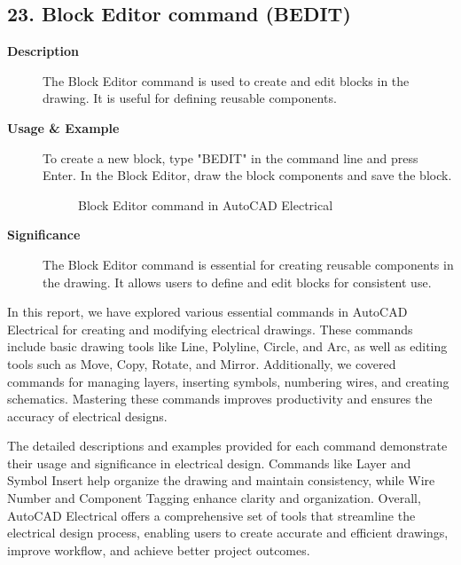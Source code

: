 \documentclass[12pt]{article}
\begin{document}
\subsection*{23. Block Editor command (BEDIT)}
\begin{description}
    \item [\textbf{Description}] The Block Editor command is used to create and edit blocks in the drawing. It is useful for defining reusable components.
    \item [\textbf{Usage \& Example}]To create a new block, type "BEDIT" in the command line and press Enter. In the Block Editor, draw the block components and save the block.
          \begin{figure}[H]
              \centering
              \caption{Block Editor command in AutoCAD Electrical}
          \end{figure}
    \item [\textbf{Significance}] The Block Editor command is essential for creating reusable components in the drawing. It allows users to define and edit blocks for consistent use.
\end{description}


In this report, we have explored various essential commands in AutoCAD Electrical for creating and modifying electrical drawings. These commands include basic drawing tools like Line, Polyline, Circle, and Arc, as well as editing tools such as Move, Copy, Rotate, and Mirror. Additionally, we covered commands for managing layers, inserting symbols, numbering wires, and creating schematics. Mastering these commands improves productivity and ensures the accuracy of electrical designs.

The detailed descriptions and examples provided for each command demonstrate their usage and significance in electrical design. Commands like Layer and Symbol Insert help organize the drawing and maintain consistency, while Wire Number and Component Tagging enhance clarity and organization. Overall, AutoCAD Electrical offers a comprehensive set of tools that streamline the electrical design process, enabling users to create accurate and efficient drawings, improve workflow, and achieve better project outcomes.

% 
% 
\end{document}
